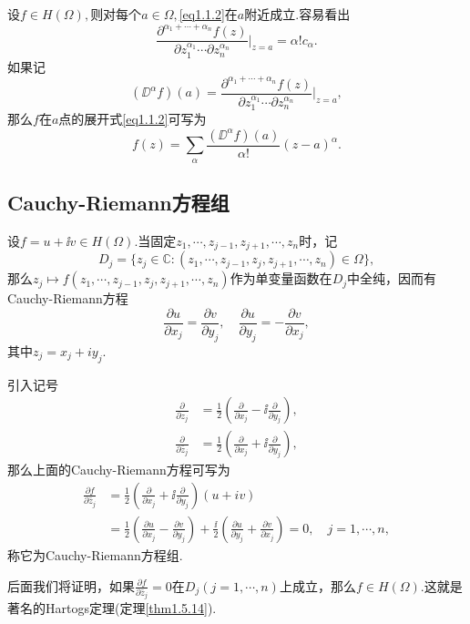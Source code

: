 设$f\in H(\Omega),$则对每个$a\in\Omega,$\eqref{eq1.1.2}在$a$附近成立.容易看出
\[\frac{\partial^{\alpha_1+\cdots+\alpha_n}f(z)}{\partial z_1^{\alpha_1}\cdots\partial z_n^{\alpha_n}}\bigg|_{z=a}=\alpha !c_{\alpha} .\]
如果记
\[(\DD^\alpha f)(a)=\frac{\partial^{\alpha_1+\cdots+\alpha_n}f(z)}{\partial z_1^{\alpha_1}\cdots\partial z_n^{\alpha_n}}\bigg|_{z=a},\]
那么$f$在$a$点的展开式\eqref{eq1.1.2}可写为
\[f(z)=\sum_\alpha\frac{(\DD^\alpha f)(a)}{\alpha!}(z-a)^\alpha .\]
\subsection{Cauchy-Riemann方程组}
设$f=u+\ii v\in H(\Omega).$当固定$z_1,\cdots,z_{j-1},z_{j+1},\cdots,z_n$时，记
\[D_j=\{z_j\in\mathbb{C}\colon (z_1,\cdots,z_{j-1},z_j,z_{j+1},\cdots,z_n)\in\Omega\},\]
那么$z_j\mapsto f(z_1,\cdots,z_{j-1},z_j,z_{j+1},\cdots,z_n)$作为单变量函数在$D_j$中全纯，因而有Cauchy-Riemann方程
\[\frac{\partial u}{\partial x_j}=\frac{\partial v}{\partial y_j},\quad \frac{\partial u}{\partial y_j}=-\frac{\partial v}{\partial x_j},\]
其中$z_j=x_j+iy_j$.


引入记号
\begin{equation}\label{eq1.1.3}
	\begin{aligned}
		\frac{\partial}{\partial z_j}
		&=\frac12\left(\frac{\partial}{\partial x_j}-\ii\frac{\partial}{\partial y_j}\right),\\
		\frac{\partial}{\partial \bar{z}_j}
		&=\frac12\left(\frac{\partial}{\partial x_j}+\ii\frac{\partial}{\partial y_j}\right),
	\end{aligned}
\end{equation}
那么上面的Cauchy-Riemann方程可写为
\begin{align*}
	\frac{\partial f}{\partial\bar{z}_j}
	&=\frac12\left(\frac{\partial }{\partial x_j}+\ii\frac{\partial}{\partial y_j}\right)(u+iv)\\
	&=\frac12\left(\frac{\partial u}{\partial x_j}-\frac{\partial v}{\partial y_j}\right)+\frac{\ii}{2}\left(\frac{\partial u}{\partial y_j}+\frac{\partial v}{\partial x_j}\right)=0,\quad j=1,\cdots,n,
\end{align*}
称它为Cauchy-Riemann方程组.


后面我们将证明，如果$\frac{\partial f}{\partial\bar{z}_j}=0$在$D_j(j=1,\cdots,n)$上成立，那么$f\in H(\Omega).$这就是著名的Hartogs定理(定理\ref{thm1.5.14}).
